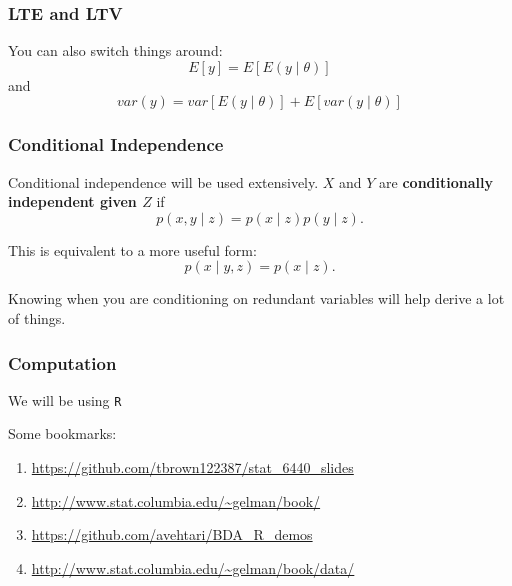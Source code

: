 \documentclass{beamer}
\begin{document}
\begin{frame}
\frametitle{LTE and LTV}

You can also switch things around:
\[
E[y] = E[E(y \mid \theta)]
\]
and
\[
var(y) = var[ E(y \mid \theta) ] + E[ var(y \mid \theta)]
\]
\end{frame}


\begin{frame}
\frametitle{Conditional Independence}

Conditional independence will be used extensively. $X$ and $Y$ are {\bf conditionally independent given $Z$} if $$
p(x,y \mid z) = p(x \mid z) p(y \mid z).
$$

This is equivalent to a more useful form:
$$
p(x \mid y, z) = p(x \mid z).
$$

Knowing when you are conditioning on redundant variables will help derive a lot of things.

\end{frame}


\begin{frame}
\frametitle{Computation}

We will be using \texttt{R}
\newline


Some bookmarks:
\begin{enumerate}
\item \url{https://github.com/tbrown122387/stat_6440_slides} 
\item \url{http://www.stat.columbia.edu/~gelman/book/}
\item \url{https://github.com/avehtari/BDA_R_demos}
\item \url{http://www.stat.columbia.edu/~gelman/book/data/}
\end{enumerate}



\end{frame}
\end{document}
